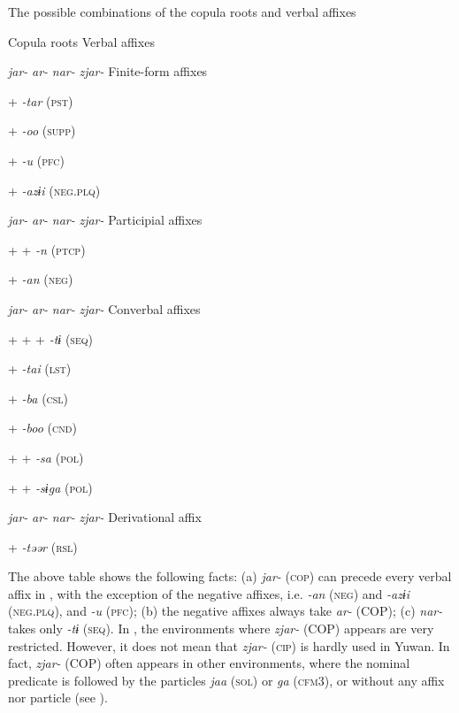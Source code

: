 \begin{table}
\caption{\label{tab:key:75}The possible combinations of the copula roots and verbal affixes}

Copula roots  Verbal affixes

\textit{jar-}  \textit{ar-}  \textit{nar-}  \textit{zjar-}  Finite-form affixes

+        \textit{{}-tar} (\textsc{pst})

+        \textit{{}-oo} (\textsc{supp})

  +      \textit{{}-u} (\textsc{pfc})

  +      \textit{{}-azɨi} (\textsc{neg}.\textsc{plq})

\textit{jar-}  \textit{ar-}  \textit{nar-}  \textit{zjar-}  Participial affixes

+      +  \textit{{}-n} (\textsc{ptcp})

  +      \textit{{}-an} (\textsc{neg})

\textit{jar-}  \textit{ar-}  \textit{nar-}  \textit{zjar-}  Converbal affixes

+  +  +    \textit{{}-tɨ} (\textsc{seq})

+        \textit{{}-tai} (\textsc{lst})

+        \textit{{}-ba} (\textsc{csl})

+        \textit{{}-boo} (\textsc{cnd})

+      +  \textit{{}-sa} (\textsc{pol})

+      +  \textit{{}-sɨga} (\textsc{pol})

\textit{jar-}  \textit{ar-}  \textit{nar-}  \textit{zjar-}  Derivational affix

+        \textit{{}-təər} (\textsc{rsl})
\end{table}

The above table shows the following facts: (a) \textit{jar-} (\textsc{cop}) can precede every verbal affix in , with the exception of the negative affixes, i.e. \textit{-an} (\textsc{neg}) and \textit{{}-azɨi} (\textsc{neg}.\textsc{plq}), and \textit{{}-u} (\textsc{pfc}); (b) the negative affixes always take \textit{ar-} (COP); (c) \textit{nar-} takes only \textit{{}-tɨ} (\textsc{seq}). In , the environments where \textit{zjar-} (COP) appears are very restricted. However, it does not mean that \textit{zjar-} (\textsc{cip}) is hardly used in Yuwan. In fact, \textit{zjar-} (COP) often appears in other environments, where the nominal predicate is followed by the particles \textit{jaa} (\textsc{sol}) or \textit{ga} (\textsc{cfm}3), or without any affix nor particle (see ).

